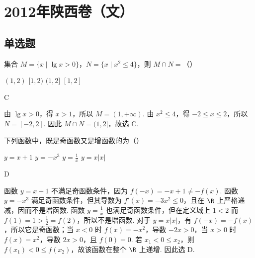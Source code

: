 \chapter{2012年陕西卷（文）}

\section{单选题}

\begin{problem}
集合 \(M = \{x \mid \lg x > 0\}\)，\(N = \{x \mid x^2 \leqslant 4\}\)，则 \(M \cap N =\)（\quad）

\choices
    {\((1,2)\)}
    {\([1,2)\)}
    {\((1,2]\)}
    {\([1,2]\)}
\end{problem}

\begin{answer}
C
\end{answer}

\begin{solution}
由 \(\lg x>0\)，得 \(x>1\)，所以 \(M=(1,+\infty)\). 由 \(x^2\leqslant4\)，得 \(-2\leqslant x\leqslant2\)，所以 \(N=[-2,2]\). 因此 \(M\cap N=(1,2]\)，故选 C.
\end{solution}

\begin{problem}
下列函数中，既是奇函数又是增函数的为（\quad）

\choices
    {\(y = x + 1\)}
    {\(y = -x^3\)}
    {\(y = \frac{1}{x}\)}
    {\(y = x|x|\)}
\end{problem}

\begin{answer}
D
\end{answer}

\begin{solution}
函数 \(y=x+1\) 不满足奇函数条件，因为 \(f(-x)=-x+1\ne-f(x)\). 函数 \(y=-x^3\) 满足奇函数条件，但其导数为 \(f'(x)=-3x^2\leqslant0\)，且在 \(\R\) 上严格递减，因而不是增函数. 函数 \(y=\frac{1}{x}\) 也满足奇函数条件，但在定义域上 \(1<2\) 而 \(f(1)=1>\frac{1}{2}=f(2)\)，所以不是增函数. 对于 \(y=x|x|\)，有 \(f(-x)=-f(x)\)，所以它是奇函数；当 \(x<0\) 时 \(f(x)=-x^2\)，导数 \(-2x>0\)，当 \(x>0\) 时 \(f(x)=x^2\)，导数 \(2x>0\)，且 \(f(0)=0\). 若 \(x_1<0\leqslant x_2\)，则 \(f(x_1)<0\leqslant f(x_2)\)，故该函数在整个 \(\R\) 上递增. 因此选 D.
\end{solution}

